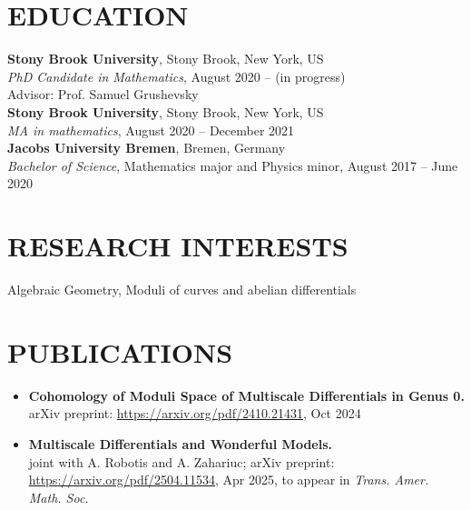 \documentclass[margin]{res}
\begin{document}

\address{700 Health Sciences Drive\\Chapin-B-1015C\\11790 Stony Brook, New York, US}
\address{prabhat.devkota@stonybrook.edu}

\begin{resume}

  \section{EDUCATION}
  \textbf{Stony Brook University}, Stony Brook, New York, US\\
  {\sl PhD Candidate in Mathematics}, August 2020 -- (in progress)\\
  Advisor: Prof. Samuel Grushevsky\\

  \textbf{Stony Brook University}, Stony Brook, New York, US\\
  {\sl MA in mathematics}, August 2020 -- December 2021\\
  
\textbf{Jacobs University Bremen}, Bremen, Germany\\
{\sl Bachelor of Science}, Mathematics major and Physics minor, August 2017 -- June 2020
\\
\section{RESEARCH INTERESTS}
Algebraic Geometry, Moduli of curves and abelian differentials
\\

\section{PUBLICATIONS}
\begin{itemize}
\item \textbf{Cohomology of Moduli Space of Multiscale Differentials in Genus 0.}\\arXiv preprint: \url{https://arxiv.org/pdf/2410.21431}, Oct 2024
\item \textbf{Multiscale Differentials and Wonderful Models.}\\joint with A. Robotis and A. Zahariuc; arXiv preprint: \url{https://arxiv.org/pdf/2504.11534}, Apr 2025, to appear in \em{Trans. Amer. Math. Soc.}
  \end{itemize}


\end{resume}
\end{document}
